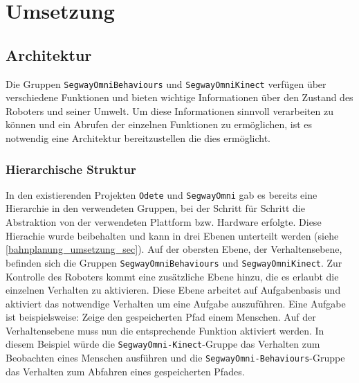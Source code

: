 
\section{Umsetzung}
\label{umsetzung_integration_sec}

\subsection{Architektur}
\label{integration_architektur_sec}

Die Gruppen \lstinline{SegwayOmniBehaviours} und \lstinline{SegwayOmniKinect} verfügen über 
verschiedene Funktionen und bieten wichtige Informationen über den Zustand des Roboters und 
seiner Umwelt. Um diese Informationen sinnvoll verarbeiten zu können und ein Abrufen der einzelnen 
Funktionen zu ermöglichen, ist es notwendig eine Architektur bereitzustellen die dies ermöglicht.

\subsubsection{Hierarchische Struktur}
\label{integration_umsetzung_hierarchie_sec}

In den existierenden Projekten \lstinline{Odete} und \lstinline{SegwayOmni} gab es bereits eine Hierarchie 
in den verwendeten Gruppen, bei der Schritt für Schritt die Abstraktion von der verwendeten 
Plattform bzw. Hardware erfolgte. Diese Hierachie wurde beibehalten und kann in drei Ebenen unterteilt 
werden (siehe \ref{bahnplanung_umsetzung_sec}). Auf der obersten Ebene, der Verhaltensebene, befinden sich die 
Gruppen \lstinline{SegwayOmniBehaviours} und \lstinline{SegwayOmniKinect}. Zur Kontrolle des Roboters kommt 
eine zusätzliche Ebene hinzu, die es erlaubt die einzelnen Verhalten zu aktivieren. Diese Ebene arbeitet auf 
Aufgabenbasis und aktiviert das notwendige Verhalten um eine Aufgabe auszuführen. Eine Aufgabe ist 
beispielsweise: Zeige den gespeicherten Pfad einem Menschen. Auf der Verhaltensebene muss nun die entsprechende 
Funktion aktiviert werden. In diesem Beispiel würde die
\lstinline{SegwayOmni-}\lstinline{Kinect}-Gruppe das Verhalten zum Beobachten
eines Menschen ausführen und die \lstinline{SegwayOmni-Behaviours}-Gruppe das
Verhalten zum Abfahren eines gespeicherten Pfades.

